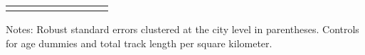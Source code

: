 \begin{table}[H]
{\begin{threeparttable}
\begin{tabular}{lcccccccc}
\bottomrule[0.5pt]                                                                               \label{tab:table2}                                                                       \end{tabular}                                                                                                    \vspace{-13pt}                                                                                           \begin{tablenotes}[flushleft]{\setlength{\itemindent}{-3pt}}          \small                                                                                                           \item Notes: Robust standard errors clustered at the city level  in  parentheses. Controls for age dummies and total track length per square kilometer.           \end{tablenotes}                                                                                         \end{threeparttable}                                                                             }                                                                                                                        \end{table}
